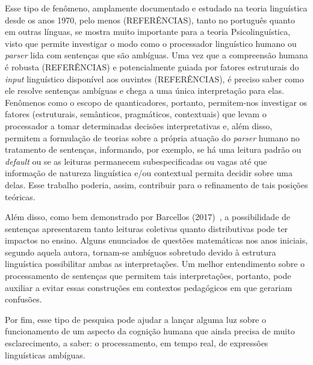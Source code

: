 Esse tipo de fenômeno, amplamente documentado e estudado na teoria linguística desde os anos 1970, pelo menos (REFERÊNCIAS), tanto no português quanto em outras línguas, se mostra muito importante para a teoria Psicolinguística, visto que permite investigar o modo como o processador linguístico humano ou \emph{parser} lida com sentenças que são ambíguas. Uma vez que a compreensão humana é robusta (REFERÊNCIAS) e potencialmente guiada por fatores estruturais do \emph{input} linguístico disponível aos ouvintes (REFERÊNCIAS), é preciso saber como ele resolve sentenças ambíguas e chega a uma única interpretação para elas. Fenômenos como o escopo de quanticadores, portanto, permitem-nos investigar os fatores (estruturais, semânticos, pragmáticos, contextuais) que levam o processador a tomar determinadas decisões interpretativas e, além disso, permitem a formulação de teorias sobre a própria atuação do \emph{parser} humano no tratamento de sentenças, informando, por exemplo, se há uma leitura padrão ou \emph{default} ou se as leituras permanecem subespecificadas ou vagas até que informação de natureza linguística e/ou contextual permita decidir sobre uma delas. Esse trabalho poderia, assim, contribuir para o refinamento de tais posições teóricas.

Além disso, como bem demonstrado por Barcellos (2017)~\cite{Barcellos2017}, a possibilidade de sentenças apresentarem tanto leituras coletivas quanto distributivas pode ter impactos no ensino. Alguns enunciados de questões matemáticas nos anos iniciais, segundo aquela autora, tornam-se ambíguos sobretudo devido à estrutura linguística possibilitar ambas as interpretações. Um melhor entendimento sobre o processamento de sentenças que permitem tais interpretações, portanto, pode auxiliar a evitar essas construções em contextos pedagógicos em que gerariam confusões.

Por fim, esse tipo de pesquisa pode ajudar a lançar alguma luz sobre o funcionamento de um aspecto da cognição humana que ainda precisa de muito esclarecimento, a saber: o processamento, em tempo real, de expressões linguísticas ambíguas.
